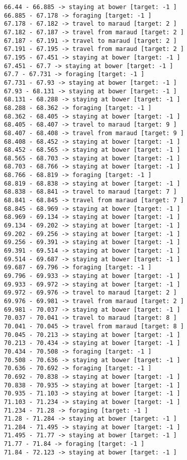 \documentclass[11pt]{article}
\begin{document}
\begin{Verbatim}[commandchars=\\\{\}]
66.44 - 66.885 -> staying at bower [target: -1 ]
66.885 - 67.178 -> foraging [target: -1 ]
67.178 - 67.182 -> travel to maraud [target: 2 ]
67.182 - 67.187 -> travel from maraud [target: 2 ]
67.187 - 67.191 -> travel to maraud [target: 2 ]
67.191 - 67.195 -> travel from maraud [target: 2 ]
67.195 - 67.451 -> staying at bower [target: -1 ]
67.451 - 67.7 -> staying at bower [target: -1 ]
67.7 - 67.731 -> foraging [target: -1 ]
67.731 - 67.93 -> staying at bower [target: -1 ]
67.93 - 68.131 -> staying at bower [target: -1 ]
68.131 - 68.288 -> staying at bower [target: -1 ]
68.288 - 68.362 -> foraging [target: -1 ]
68.362 - 68.405 -> staying at bower [target: -1 ]
68.405 - 68.407 -> travel to maraud [target: 9 ]
68.407 - 68.408 -> travel from maraud [target: 9 ]
68.408 - 68.452 -> staying at bower [target: -1 ]
68.452 - 68.565 -> staying at bower [target: -1 ]
68.565 - 68.703 -> staying at bower [target: -1 ]
68.703 - 68.766 -> staying at bower [target: -1 ]
68.766 - 68.819 -> foraging [target: -1 ]
68.819 - 68.838 -> staying at bower [target: -1 ]
68.838 - 68.841 -> travel to maraud [target: 7 ]
68.841 - 68.845 -> travel from maraud [target: 7 ]
68.845 - 68.969 -> staying at bower [target: -1 ]
68.969 - 69.134 -> staying at bower [target: -1 ]
69.134 - 69.202 -> staying at bower [target: -1 ]
69.202 - 69.256 -> staying at bower [target: -1 ]
69.256 - 69.391 -> staying at bower [target: -1 ]
69.391 - 69.514 -> staying at bower [target: -1 ]
69.514 - 69.687 -> staying at bower [target: -1 ]
69.687 - 69.796 -> foraging [target: -1 ]
69.796 - 69.933 -> staying at bower [target: -1 ]
69.933 - 69.972 -> staying at bower [target: -1 ]
69.972 - 69.976 -> travel to maraud [target: 2 ]
69.976 - 69.981 -> travel from maraud [target: 2 ]
69.981 - 70.037 -> staying at bower [target: -1 ]
70.037 - 70.041 -> travel to maraud [target: 8 ]
70.041 - 70.045 -> travel from maraud [target: 8 ]
70.045 - 70.213 -> staying at bower [target: -1 ]
70.213 - 70.434 -> staying at bower [target: -1 ]
70.434 - 70.508 -> foraging [target: -1 ]
70.508 - 70.636 -> staying at bower [target: -1 ]
70.636 - 70.692 -> foraging [target: -1 ]
70.692 - 70.838 -> staying at bower [target: -1 ]
70.838 - 70.935 -> staying at bower [target: -1 ]
70.935 - 71.103 -> staying at bower [target: -1 ]
71.103 - 71.234 -> staying at bower [target: -1 ]
71.234 - 71.28 -> foraging [target: -1 ]
71.28 - 71.284 -> staying at bower [target: -1 ]
71.284 - 71.495 -> staying at bower [target: -1 ]
71.495 - 71.77 -> staying at bower [target: -1 ]
71.77 - 71.84 -> foraging [target: -1 ]
71.84 - 72.123 -> staying at bower [target: -1 ]

\end{Verbatim}
\end{document}
